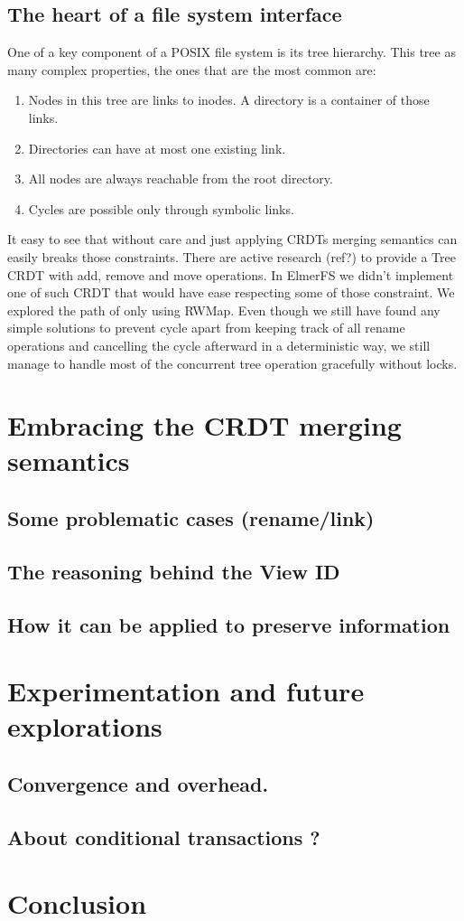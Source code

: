 \documentclass[sigplan, 10pt]{acmart}
\begin{document}
\subsection{The heart of a file system interface}

One of a key component of a POSIX file system is its tree hierarchy.
This tree as many complex properties, the ones that are the most common are:

\begin{enumerate}
    \item Nodes in this tree are links to inodes. A directory is a container
    of those links.
    \item Directories can have at most one existing link.
    \item All nodes are always reachable from the root directory.
    \item Cycles are possible only through symbolic links.
\end{enumerate}

It easy to see that without care and just applying CRDTs merging semantics
can easily breaks those constraints. There are active research (ref?)
to provide a Tree CRDT with add, remove and move operations.
In ElmerFS we didn't implement one of such CRDT that would have ease respecting
some of those constraint. We explored the path of only using RWMap.
Even though we still have found any simple solutions to prevent cycle apart from
keeping track of all rename operations and cancelling the cycle afterward in a deterministic way,
we still manage to handle most of the concurrent tree operation gracefully without
locks.

\section{Embracing the CRDT merging semantics}

\subsection{Some problematic cases (rename/link)}
\subsection{The reasoning behind the View ID}
\subsection{How it can be applied to preserve information}

\section{Experimentation and future explorations}

\subsection{Convergence and overhead.}
\subsection{About conditional transactions ?}

\section{Conclusion}
\end{document}
